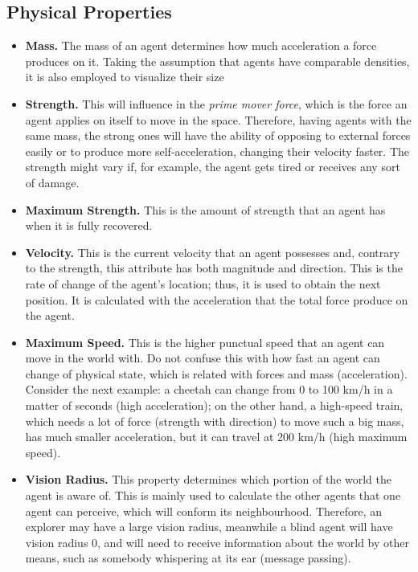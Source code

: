 \subsection{Physical Properties}

\begin{itemize}

\item{{\bf Mass.} The mass of an agent determines how much acceleration a force produces on it.
Taking the assumption that agents have comparable densities, it is also employed to visualize their size}

\item{{\bf Strength.} This will influence in the \emph{prime mover force}, which is the force an agent applies on itself to move in the space. Therefore, having agents with the same mass, the strong ones will have the ability of opposing to external forces easily or to produce more self-acceleration, changing their velocity faster. The strength might vary if, for example, the agent gets tired or receives any sort of damage.}

\item{{\bf Maximum Strength.} This is the amount of strength that an agent has when it is fully recovered.}

\item{{\bf Velocity.} This is the current velocity that an agent possesses and, contrary to the strength, this attribute has both magnitude and direction. This is the rate of change of the agent's location; thus, it is used to obtain the next position. It is calculated with the acceleration that the total force produce on the agent.}

\item{{\bf Maximum Speed.} This is the higher punctual speed that an agent can move in the world with. Do not confuse this with how fast an agent can change of physical state, which is related with forces and mass (acceleration). Consider the next example: a cheetah can change from 0 to 100 km/h in a matter of seconds (high acceleration); on the other hand, a high-speed train, which needs a lot of force (strength with direction) to move such a big mass, has much smaller acceleration, but it can travel at 200 km/h (high maximum speed).}

\item{{\bf Vision Radius.} This property determines which portion of the world the agent is aware of. This is mainly used to calculate the other agents that one agent can perceive, which will conform its neighbourhood. Therefore, an explorer may have a large vision radius, meanwhile a blind agent will have vision radius 0, and will need to receive information about the world by other means, such as somebody whispering at its ear (message passing).}

\end{itemize}

